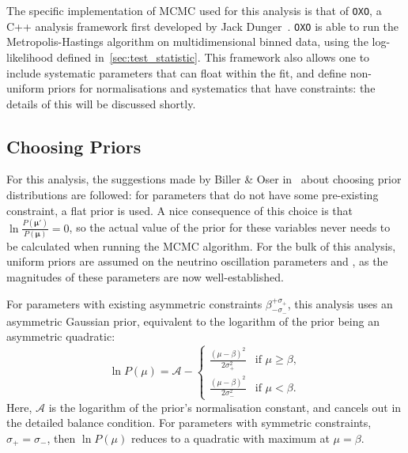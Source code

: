 The specific implementation of MCMC used for this analysis is that of \texttt{OXO}, a C++ analysis framework first developed by Jack Dunger~\cite{dungerTopologicalTimeBased2018}. %
\texttt{OXO} is able to run the Metropolis-Hastings algorithm on multidimensional binned data, using the log-likelihood defined in~\ref{sec:test_statistic}. This framework also allows one to include systematic parameters that can float within the fit, and define non-uniform priors for normalisations and systematics that have constraints: the details of this will be discussed shortly.

\subsection{Choosing Priors}
For this analysis, the suggestions made by Biller \& Oser in~\cite{billerAnotherLookConfidence2015} %
about choosing prior distributions are followed: for parameters that do not have some pre-existing constraint, a flat prior is used. A nice consequence of this choice is that $\ln{\frac{P\left(\bm{\mu}'\right)}{P\left(\bm{\mu}\right)}} = 0$, so the actual value of the prior for these variables never needs to be calculated when running the MCMC algorithm. For the bulk of this analysis, uniform priors are assumed on the neutrino oscillation parameters \dmsq{} and \tonetwo{}, as the magnitudes of these parameters are now well-established.

For parameters with existing asymmetric constraints $\beta^{+\sigma_{+}}_{-\sigma_{-}}$, this analysis uses an asymmetric Gaussian prior, equivalent to the logarithm of the prior being an asymmetric quadratic:
\begin{equation}
    \ln{P\left(\mu\right)} = \mathcal{A} -
    \begin{cases}
        \frac{\left(\mu-\beta\right)^{2}}{2\sigma_{+}^{2}} & \textrm{if } \mu\geq\beta,\\
        \frac{\left(\mu-\beta\right)^{2}}{2\sigma_{-}^{2}} & \textrm{if } \mu<\beta.
    \end{cases}
\end{equation}
Here, $\mathcal{A}$ is the logarithm of the prior's normalisation constant, and cancels out in the detailed balance condition. For parameters with symmetric constraints, $\sigma_{+}=\sigma_{-}$, then $\ln{P\left(\mu\right)}$ reduces to a quadratic with maximum at $\mu = \beta$.


